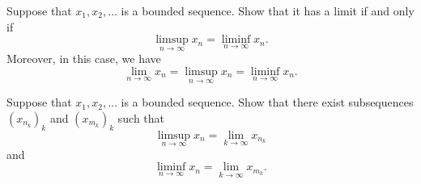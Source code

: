 \documentclass[11pt,letterpaper]{article}
\newenvironment{prob}[1]
  {\renewcommand\theinnerprob{#1}\innerprob}
  {\endinnerprob}
\newenvironment{solution}
  {\renewcommand\qedsymbol{}\begin{proof}[Solution]}
  {\end{proof}\bigskip}
\begin{document}
\begin{prob}{3}  %
Suppose that $x_1, x_2, \dots$ is a bounded sequence.  Show that it has a limit if and only if
\[
	\limsup_{n\to\infty} x_n = \liminf_{n\to\infty} x_n.
\]
Moreover, in this case, we have
\[
	\lim_{n\to\infty} x_n
		= \limsup_{n\to\infty} x_n
		= \liminf_{n\to\infty} x_n.
\]
 \end{prob}






\begin{prob}{4}  %
Suppose that $x_1, x_2, \dots$ is a bounded sequence.  Show that there exist subsequences $(x_{n_k})_k$ and $(x_{m_k})_k$ such that
\[
	\limsup_{n\to\infty} x_n = \lim_{k\to\infty} x_{n_k}
\]
and
\[
	\liminf_{n\to\infty} x_n = \lim_{k\to\infty} x_{m_k}.
\]
\end{prob}
\end{document}
